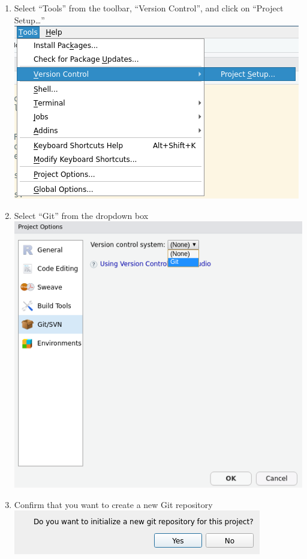 \documentclass[
]{book}
\begin{document}
\begin{enumerate}
\def\labelenumi{\arabic{enumi}.}
\item
  Select ``Tools'' from the toolbar, ``Version Control'', and click on ``Project Setup\ldots{}''
  \includegraphics{images/02-newgit_2.png}
\item
  Select ``Git'' from the dropdown box
  \includegraphics{images/02-newgit_3.png}
\item
  Confirm that you want to create a new Git repository
  \includegraphics{images/02-newgit_4.png}

\end{enumerate}
\end{document}
